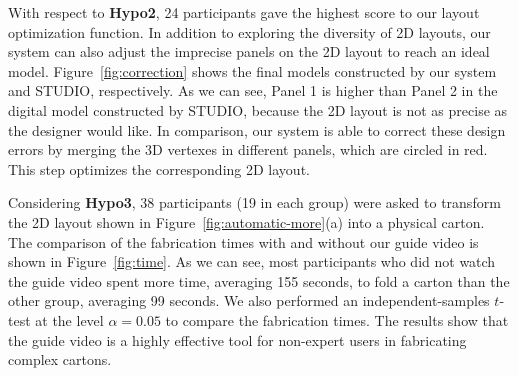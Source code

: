 With respect to \textbf{Hypo2}, 24 participants gave the highest score to our layout optimization function. 
%
In addition to exploring the diversity of 2D layouts, our system can also adjust the imprecise panels on the 2D layout to reach an ideal model. Figure~\ref{fig:correction} shows the final models constructed by our system and STUDIO, respectively. As we can see, Panel 1 is higher than Panel 2 in the digital model constructed by STUDIO, because the 2D layout is not as precise as the designer would like. 
%
In comparison, our system is able to correct these design errors by merging the 3D vertexes in different panels, which are circled in red. This step optimizes the corresponding 2D layout.
 
 
Considering \textbf{Hypo3}, 38 participants (19 in each group) were asked to transform the 2D layout shown in Figure~\ref{fig:automatic-more}(a) into a physical carton. 
The comparison of the fabrication times with and without our guide video is shown in Figure~\ref{fig:time}. 
As we can see, most participants who did not watch the guide video spent more time, averaging 155 seconds, to fold a carton than the other group, averaging 99 seconds.
% 
%
We also performed an independent-samples $t$-test at the level $\alpha = 0.05$ to compare the fabrication times. The results show that the guide video is a highly effective tool for non-expert users in fabricating complex cartons. 


